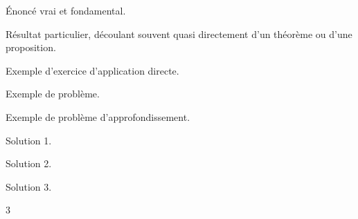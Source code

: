\begin{theorem*}
	Énoncé vrai et fondamental.
\end{theorem*}

\begin{corollaire*}
	Résultat particulier, découlant souvent quasi directement d'un théorème ou d'une proposition.
\end{corollaire*}

\begin{Exercise}[label=1]%
	Exemple d'exercice d'application directe.
\end{Exercise}
\begin{Exercise}[difficulty=1, label=2]%
	Exemple de problème.
\end{Exercise}
\begin{Exercise}[difficulty=2, label=3]%
	Exemple de problème d'approfondissement.
\end{Exercise}
\shipoutExercise
\begin{Answer}[ref=1]
	Solution 1.
\end{Answer}
\begin{Answer}[ref=2]
	Solution 2.
\end{Answer}
\begin{Answer}[ref=3]
	Solution 3.
\end{Answer}
\begin{multicols}{3}
\shipoutAnswer
\end{multicols}
